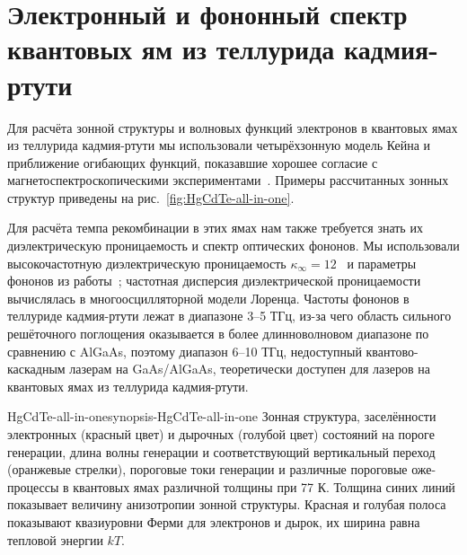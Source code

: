 \section{Электронный и фононный спектр квантовых ям из теллурида кадмия-ртути} \label{sec:HgCdTe-basics}
Для расчёта зонной структуры и волновых функций электронов в квантовых ямах из теллурида кадмия-ртути мы использовали четырёхзонную модель Кейна и приближение огибающих функций, показавшие хорошее согласие с магнетоспектроскопическими экспериментами~\cite{Kane_model}. Примеры рассчитанных зонных структур приведены на рис.~\ref{fig:HgCdTe-all-in-one}. 
%

Для расчёта темпа рекомбинации в этих ямах нам также требуется знать их диэлектрическую проницаемость и спектр оптических фононов. Мы использовали высокочастотную диэлектрическую проницаемость $\kappa_{\infty} = 12$~\cite{HgCdTe-high-frequency_kappa} и параметры фононов из работы~\cite{HgCdTe-phonon_params}; частотная дисперсия диэлектрической проницаемости вычислялась в многоосцилляторной модели Лоренца. Частоты фононов в теллуриде кадмия-ртути лежат в диапазоне 3--5 ТГц, из-за чего область сильного решёточного поглощения оказывается в более длинноволновом диапазоне по сравнению с AlGaAs, поэтому диапазон 6--10 ТГц, недоступный квантово-каскадным лазерам на GaAs/AlGaAs, теоретически доступен для лазеров на квантовых ямах из теллурида кадмия-ртути.
\begin{fig}{HgCdTe-all-in-one}{synopsis-HgCdTe-all-in-one} Зонная структура, заселённости электронных (красный цвет) и дырочных (голубой цвет) состояний на пороге генерации, длина волны генерации и соответствующий вертикальный переход (оранжевые стрелки), пороговые токи генерации и различные пороговые оже-процессы в квантовых ямах \HgCdTe{} различной толщины при 77 К. Толщина синих линий показывает величину анизотропии зонной структуры. Красная и голубая полоса показывают квазиуровни Ферми для электронов и дырок, их ширина равна тепловой энергии $k T$.
\end{fig}
